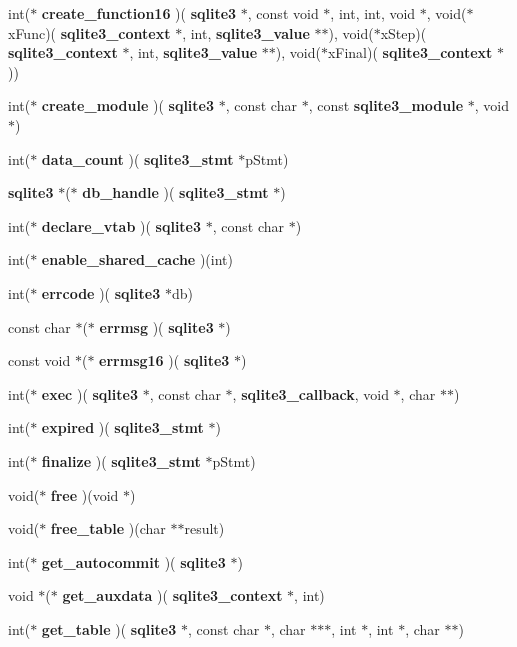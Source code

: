 \begin{DoxyCompactItemize}
\item 
int($\ast$ \textbf{ create\+\_\+function16} )(\textbf{ sqlite3} $\ast$, const void $\ast$, int, int, void $\ast$, void($\ast$x\+Func)(\textbf{ sqlite3\+\_\+context} $\ast$, int, \textbf{ sqlite3\+\_\+value} $\ast$$\ast$), void($\ast$x\+Step)(\textbf{ sqlite3\+\_\+context} $\ast$, int, \textbf{ sqlite3\+\_\+value} $\ast$$\ast$), void($\ast$x\+Final)(\textbf{ sqlite3\+\_\+context} $\ast$))
\item 
int($\ast$ \textbf{ create\+\_\+module} )(\textbf{ sqlite3} $\ast$, const char $\ast$, const \textbf{ sqlite3\+\_\+module} $\ast$, void $\ast$)
\item 
int($\ast$ \textbf{ data\+\_\+count} )(\textbf{ sqlite3\+\_\+stmt} $\ast$p\+Stmt)
\item 
\textbf{ sqlite3} $\ast$($\ast$ \textbf{ db\+\_\+handle} )(\textbf{ sqlite3\+\_\+stmt} $\ast$)
\item 
int($\ast$ \textbf{ declare\+\_\+vtab} )(\textbf{ sqlite3} $\ast$, const char $\ast$)
\item 
int($\ast$ \textbf{ enable\+\_\+shared\+\_\+cache} )(int)
\item 
int($\ast$ \textbf{ errcode} )(\textbf{ sqlite3} $\ast$db)
\item 
const char $\ast$($\ast$ \textbf{ errmsg} )(\textbf{ sqlite3} $\ast$)
\item 
const void $\ast$($\ast$ \textbf{ errmsg16} )(\textbf{ sqlite3} $\ast$)
\item 
int($\ast$ \textbf{ exec} )(\textbf{ sqlite3} $\ast$, const char $\ast$, \textbf{ sqlite3\+\_\+callback}, void $\ast$, char $\ast$$\ast$)
\item 
int($\ast$ \textbf{ expired} )(\textbf{ sqlite3\+\_\+stmt} $\ast$)
\item 
int($\ast$ \textbf{ finalize} )(\textbf{ sqlite3\+\_\+stmt} $\ast$p\+Stmt)
\item 
void($\ast$ \textbf{ free} )(void $\ast$)
\item 
void($\ast$ \textbf{ free\+\_\+table} )(char $\ast$$\ast$result)
\item 
int($\ast$ \textbf{ get\+\_\+autocommit} )(\textbf{ sqlite3} $\ast$)
\item 
void $\ast$($\ast$ \textbf{ get\+\_\+auxdata} )(\textbf{ sqlite3\+\_\+context} $\ast$, int)
\item 
int($\ast$ \textbf{ get\+\_\+table} )(\textbf{ sqlite3} $\ast$, const char $\ast$, char $\ast$$\ast$$\ast$, int $\ast$, int $\ast$, char $\ast$$\ast$)
\item 
$$
\end{DoxyCompactItemize}
